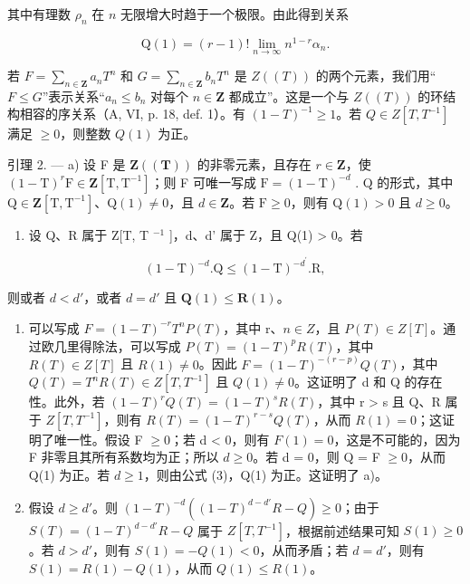 其中有理数 \(\rho_{n}\) 在 \(n\) 无限增大时趋于一个极限。由此得到关系

\[
\mathrm{Q} (1) = (r - 1)! \lim _ {n \rightarrow \infty} n ^ {1 - r} \alpha_ {n}.\tag{3}
\]

若 \(F = \sum_{n \in \mathbf{Z}} a_n T^n\) 和 \(G = \sum_{n \in \mathbf{Z}} b_n T^n\) 是 \(Z((T))\) 的两个元素，我们用“\(F \leqslant G\)”表示关系“\(a_n \leqslant b_n\) 对每个 \(n \in \mathbf{Z}\) 都成立”。这是一个与 \(Z((T))\) 的环结构相容的序关系（A, VI, p. 18, def. 1）。有 \((1 - T)^{-1} \geqslant 1\)。若 \(Q \in Z[T, T^{-1}]\) 满足 \(\geqslant 0\)，则整数 \(Q(1)\) 为正。

引理 2. --- a) 设 F 是 \(\mathbf{Z}((\mathbf{T}))\) 的非零元素，且存在 \(r \in \mathbf{Z}\)，使 \((1 - \mathrm{T})^r\mathrm{F} \in \mathbf{Z}[\mathrm{T}, \mathrm{T}^{-1}]\)；则 F 可唯一写成 \(\mathrm{F} = (1 - \mathrm{T})^{-d}\) . Q 的形式，其中 \(\mathrm{Q} \in \mathbf{Z}[\mathrm{T}, \mathrm{T}^{-1}]\)、\(\mathrm{Q}(1) \neq 0\)，且 \(d \in \mathbf{Z}\)。若 \(\mathrm{F} \geqslant 0\)，则有 \(\mathrm{Q}(1) > 0\) 且 \(d \geqslant 0\)。

\begin{enumerate}
\def\labelenumi{\alph{enumi})}
\setcounter{enumi}{1}
\tightlist
\item
  设 Q、R 属于 Z{[}T, T \(^{-1}\) {]}，d、d' 属于 Z，且 Q(1) \textgreater{} 0。若
\end{enumerate}

\[
(1 - \mathrm{T}) ^ {- d}. \mathrm{Q} \leqslant (1 - \mathrm{T}) ^ {- d ^ {\prime}}. \mathrm{R},
\]

则或者 \(d < d'\)，或者 \(d = d'\) 且 \(\mathbf{Q}(1) \leqslant \mathbf{R}(1)\)。

\begin{enumerate}
\def\labelenumi{\alph{enumi})}
\item
  可以写成 \(F = (1 - T)^{-r} T^{n} P(T)\)，其中 r、\(n \in Z\)，且 \(P(T) \in Z[T]\)。通过欧几里得除法，可以写成 \(P(T) = (1 - T)^{p} R(T)\)，其中 \(R(T) \in Z[T]\) 且 \(R(1) \neq 0\)。因此 \(F = (1 - T)^{-(r-p)} Q(T)\)，其中 \(Q(T) = T^{n} R(T) \in Z[T, T^{-1}]\) 且 \(Q(1) \neq 0\)。这证明了 d 和 Q 的存在性。此外，若 \((1 - T)^{r} Q(T) = (1 - T)^{s} R(T)\)，其中 r \textgreater{} s 且 Q、R 属于 \(Z[T, T^{-1}]\)，则有 \(R(T) = (1 - T)^{r-s} Q(T)\)，从而 \(R(1) = 0\)；这证明了唯一性。假设 F \(\geqslant 0\)；若 d \textless{} 0，则有 \(F(1) = 0\)，这是不可能的，因为 F 非零且其所有系数均为正；所以 \(d \geqslant 0\)。若 d = 0，则 Q = F \(\geqslant 0\)，从而 Q(1) 为正。若 \(d \geqslant 1\)，则由公式 (3)，Q(1) 为正。这证明了 a)。
\item
  假设 \(d \geqslant d'\)。则 \((1 - T)^{-d}((1 - T)^{d - d'} R - Q) \geqslant 0\)；由于 \(S(T) = (1 - T)^{d - d'} R - Q\) 属于 \(Z[T, T^{-1}]\)，根据前述结果可知 \(S(1) \geqslant 0\)。若 \(d > d'\)，则有 \(S(1) = -Q(1) < 0\)，从而矛盾；若 \(d = d'\)，则有 \(S(1) = R(1) - Q(1)\)，从而 \(Q(1) \leqslant R(1)\)。
\end{enumerate}

